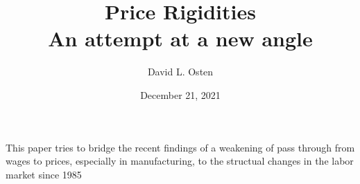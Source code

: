 \documentclass[ProjectDLO]{subfiles}
\begin{document}
\providecommand{\versn}{pdf} %
\ifthenelse{\boolean{Web}}{    %
  \renewcommand{\versn}{Web}     %
  \renewcommand{\rootFromOut}{.} %
}{}  %


\title{Price Rigidities \\ An attempt at a new angle}

\author{David L. Osten\authNum}



\renewcommand{\forcedate}{December 21, 2021}\date{\forcedate}

\maketitle
\hypertarget{abstract}{This paper tries to bridge the recent findings of a weakening of pass through from wages to prices, especially in manufacturing, to the structual changes in the labor market since 1985}
\begin{abstract}

\end{abstract}


\hypertarget{links}{}
\end{document}
